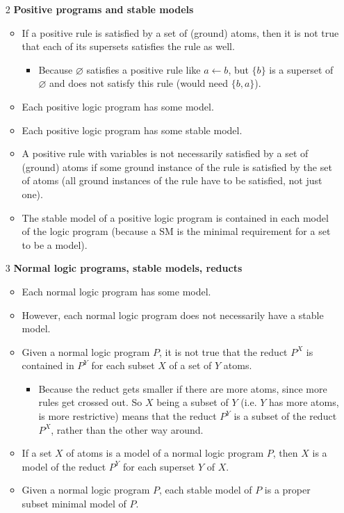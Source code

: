 \documentclass[9pt,a4paper,landscape]{article}
\begin{document}
{\begin{itemize}
	\item[2] \textbf{Positive programs and stable models}
	\begin{itemize}[noitemsep]
		\item If a positive rule is satisfied by a set of (ground) atoms, then it is not true that each of its supersets satisfies the rule as well.
		\begin{itemize}[noitemsep]
			\item Because $\varnothing$ satisfies a positive rule like $a \leftarrow b$, but $\{b\}$ is a superset of $\varnothing$ and does not satisfy this rule (would need $\{b, a\}$).
		\end{itemize}
		\item Each positive logic program has some model.
		\item Each positive logic program has some stable model.
		\item A positive rule with variables is not necessarily satisfied by a set of (ground) atoms if some ground instance of the rule is satisfied by the set of atoms (all ground instances of the rule have to be satisfied, not just one).
		\item The stable model of a positive logic program is contained in each model of the logic program (because a SM is the minimal requirement for a set to be a model).
	\end{itemize}
	
	\item[3] \textbf{Normal logic programs, stable models, reducts}
	\begin{itemize}[noitemsep]
		\item Each normal logic program has some model.
		\item However, each normal logic program does not necessarily have a stable model.
		\item Given a normal logic program $P$, it is not true that the reduct $P^X$ is contained in $P^Y$ for each subset $X$ of a set of $Y$ atoms.
		\begin{itemize}[noitemsep]
			\item Because the reduct gets smaller if there are more atoms, since more rules get crossed out. So $X$ being a subset of $Y$ (i.e. $Y$ has more atoms, is more restrictive) means that the reduct $P^Y$ is a subset of the reduct $P^X$, rather than the other way around.
		\end{itemize}
		\item If a set $X$ of atoms is a model of a normal logic program $P$, then $X$ is a model of the reduct $P^Y$ for each superset $Y$ of $X$.
		\item Given a normal logic program $P$, each stable model of $P$ is a proper subset minimal model of $P$.
	\end{itemize}
	

\end{itemize}}
\end{document}
